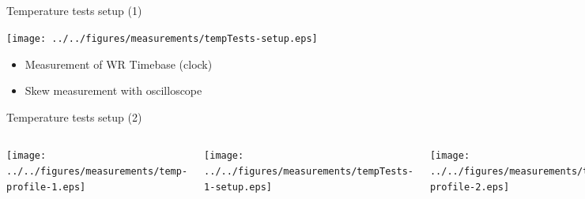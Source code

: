 \documentclass[compress,red]{beamer}
\begin{document}
\subsection{}
\begin{frame}{Temperature tests setup (1)}

	\begin{center}
	\texttt{[image: ../../figures/measurements/tempTests-setup.eps]}

	\begin{itemize}
		\item Measurement of WR Timebase (clock)
		\item Skew measurement with oscilloscope
	\end{itemize}	

	\end{center}


\end{frame}
\begin{frame}{Temperature tests setup (2)}

\vspace{-1cm}
  \begin{columns}[c]
		\hspace{-1cm}
		\begin{center}
		\texttt{[image: ../../figures/measurements/temp-profile-1.eps]}
		\end{center}
\vspace{-0.5cm}
		\begin{center}
		\texttt{[image: ../../figures/measurements/tempTests-1-setup.eps]}
		\end{center}
		\hspace{-1cm}
		\begin{center}
		\texttt{[image: ../../figures/measurements/temp-profile-2.eps]}
		\end{center}
		\vspace{-0.5cm}
		\begin{center}
		\texttt{[image: ../../figures/measurements/tempTests-2-setup.eps]}
		\end{center}
  \end{columns}

\end{frame}
\end{document}
